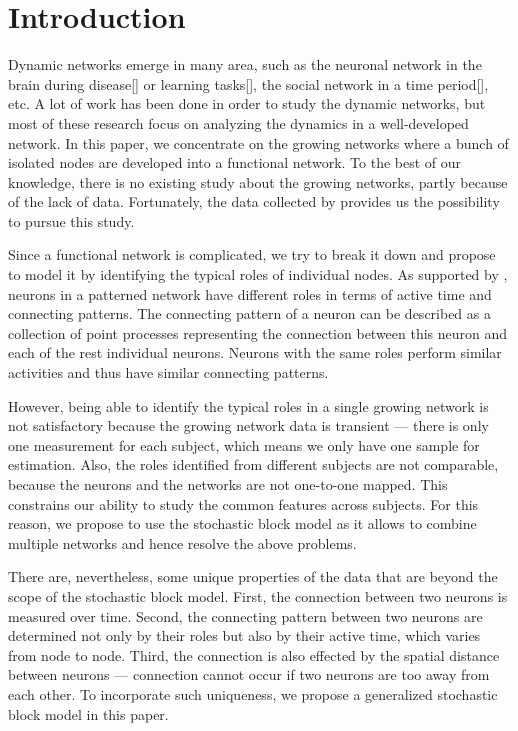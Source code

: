 

\section{Introduction}

Dynamic networks emerge in many area,
such as the neuronal network in the brain during disease[] or learning tasks[], 
the social network in a time period[], etc.
A lot of work has been done in order to study the dynamic networks,
but most of these research focus on analyzing the dynamics in a well-developed network.
In this paper, we concentrate on the growing networks where a bunch of isolated nodes are developed into a functional network.
To the best of our knowledge, there is no existing study about the growing networks, partly because of the lack of data.
Fortunately, the data collected by \citet{Wan2019} provides us the possibility to pursue this study.


Since a functional network is complicated, we try to break it down and propose to model it by identifying the typical roles of individual nodes. 
As supported by \cite{Wan2019}, neurons in a patterned network have different roles in terms of active time and connecting patterns. 
The connecting pattern of a neuron can be described as a collection of point processes representing the connection between this neuron and each of the rest individual neurons.
Neurons with the same roles perform similar activities and thus have similar connecting patterns. 



However, being able to identify the typical roles in a single growing network is not satisfactory because 
the growing network data is transient --- there is only one measurement for each subject, which means we only have one sample for estimation.
Also, the roles identified from different subjects are not comparable, because the neurons and the networks are not one-to-one mapped. 
This constrains our ability to study the common features across subjects.
For this reason, we propose to use the stochastic block model as it allows to combine multiple networks and hence resolve the above problems.


There are, nevertheless, some unique properties of the data that are beyond the scope of the stochastic block model.
First, the connection between two neurons is measured over time.
Second, the connecting pattern between two neurons are determined not only by their roles but also by their active time, which varies from node to node.
Third, the connection is also effected by the spatial distance between neurons --- connection cannot occur if two neurons are too away from each other.
To incorporate such uniqueness, we propose a generalized stochastic block model in this paper.



